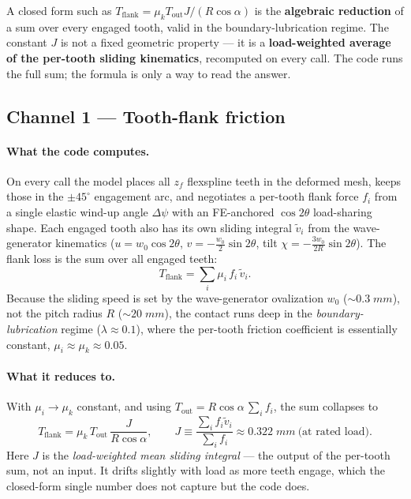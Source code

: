 \documentclass[11pt,a4paper]{article}
\begin{document}
\begin{keyresult}
A closed form such as \(T_\text{flank}=\mu_k T_\text{out} J/(R\cos\alpha)\)
is the \textbf{algebraic reduction} of a sum over every engaged tooth,
valid in the boundary-lubrication regime.  The constant \(J\) is not a
fixed geometric property — it is a \textbf{load-weighted average of the
per-tooth sliding kinematics}, recomputed on every call.  The code runs
the full sum; the formula is only a way to read the answer.
\end{keyresult}

\subsection{Channel 1 — Tooth-flank friction}

\paragraph{What the code computes.}
On every call the model places all \(z_f\) flexspline teeth in the
deformed mesh, keeps those in the \(\pm45^\circ\) engagement arc, and
negotiates a per-tooth flank force \(f_i\) from a single elastic
wind-up angle \(\Delta\psi\) with an FE-anchored \(\cos 2\theta\)
load-sharing shape.  Each engaged tooth also has its own sliding
integral \(\tilde v_i\) from the wave-generator kinematics
(\(u=w_0\cos2\theta\), \(v=-\tfrac{w_0}{2}\sin2\theta\), tilt
\(\chi=-\tfrac{3w_0}{2R}\sin2\theta\)).  The flank loss is the sum
over all engaged teeth:
\[
  T_\text{flank} = \sum_i \mu_i \, f_i \, \tilde v_i .
\]
Because the sliding speed is set by the wave-generator ovalization
\(w_0\) (\(\sim0.3\;\si{mm}\)), not the pitch radius \(R\)
(\(\sim20\;\si{mm}\)), the contact runs deep in the
\textit{boundary-lubrication} regime (\(\lambda\approx0.1\)), where the
per-tooth friction coefficient is essentially constant,
\(\mu_i\approx\mu_k\approx0.05\).

\paragraph{What it reduces to.}
With \(\mu_i\to\mu_k\) constant, and using
\(T_\text{out}=R\cos\alpha\,\sum_i f_i\), the sum collapses to
\[
  T_\text{flank} = \mu_k\,T_\text{out}\,\frac{J}{R\cos\alpha},
  \qquad
  J \equiv \frac{\sum_i f_i \tilde v_i}{\sum_i f_i}
         \approx 0.322\;\si{mm}\ \text{(at rated load)} .
\]
Here \(J\) is the \emph{load-weighted mean sliding integral} — the output
of the per-tooth sum, not an input.  It drifts slightly with load as more
teeth engage, which the closed-form single number does not capture but the
code does.
\end{document}
